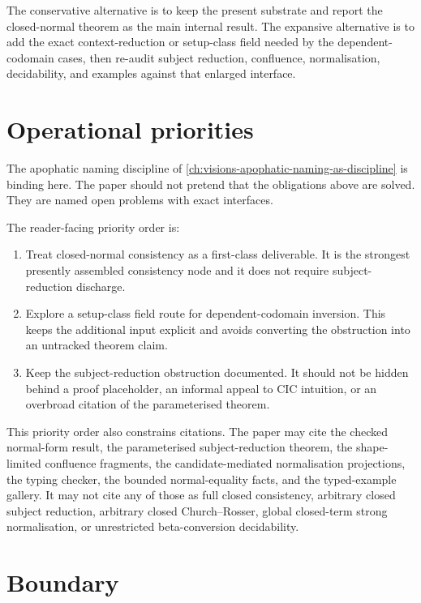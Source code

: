 The conservative alternative is to keep the present substrate and report the
closed-normal theorem as the main internal result. The expansive alternative is
to add the exact context-reduction or setup-class field needed by the
dependent-codomain cases, then re-audit subject reduction, confluence,
normalisation, decidability, and examples against that enlarged interface.

\section{Operational priorities}
\label{sec:metacic-open-problems-operational-priorities}

The apophatic naming discipline of
\autoref{ch:visions-apophatic-naming-as-discipline} is binding here. The paper
should not pretend that the obligations above are solved. They are named open
problems with exact interfaces.

The reader-facing priority order is:

\begin{enumerate}
\item Treat closed-normal consistency as a first-class deliverable. It is the
  strongest presently assembled consistency node and it does not require
  subject-reduction discharge.
\item Explore a setup-class field route for dependent-codomain inversion. This
  keeps the additional input explicit and avoids converting the obstruction
  into an untracked theorem claim.
\item Keep the subject-reduction obstruction documented. It should not be
  hidden behind a proof placeholder, an informal appeal to CIC intuition, or an
  overbroad citation of the parameterised theorem.
\end{enumerate}

This priority order also constrains citations. The paper may cite the checked
normal-form result, the parameterised subject-reduction theorem, the
shape-limited confluence fragments, the candidate-mediated normalisation
projections, the typing checker, the bounded normal-equality facts, and the
typed-example gallery. It may not cite any of those as full closed consistency,
arbitrary closed subject reduction, arbitrary closed Church--Rosser, global
closed-term strong normalisation, or unrestricted beta-conversion
decidability.

\section{Boundary}
\label{sec:metacic-open-problems-boundary}

